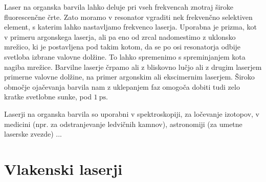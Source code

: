 Laser na organska barvila lahko deluje pri vseh frekvencah znotraj široke
fluorescenčne črte. Zato moramo v resonator vgraditi nek frekvenčno
selektiven element, s katerim lahko nastavljamo frekvenco laserja. Uporabna
je prizma, kot v primeru argonskega laserja, ali pa eno od zrcal nadomestimo 
z uklonsko mrežico, ki je postavljena pod takim kotom, da se po osi resonatorja odbije svetloba
izbrane valovne dolžine. To lahko spremenimo s spreminjanjem kota nagiba mrežice.
Barvilne laserje črpamo ali z bliskovno lučjo ali z drugim laserjem primerne 
valovne dolžine, na primer argonskim ali ekscimernim laserjem. 
Široko območje ojačevanja barvila nam z uklepanjem faz omogoča dobiti
tudi zelo kratke svetlobne sunke, pod $1~\si{\pico\second}$.

Laserji na organska barvila so uporabni v spektroskopiji, za ločevanje izotopov, v 
medicini (npr. za odstranjevanje ledvičnih kamnov), astronomiji (za umetne laserske zvezde) ...
 
\section{Vlakenski laserji}

